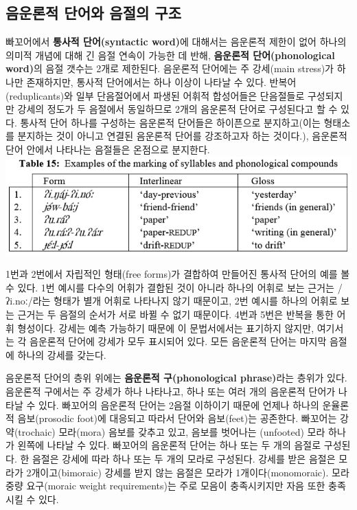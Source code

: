 \subsection{음운론적 단어와 음절의 구조}
빠꼬어에서 \textbf{통사적 단어(syntactic word)}에 대해서는 음운론적 제한이 없어 하나의 의미적 개념에 대해 긴 음절 연속이 가능한 데 반해,  \textbf{음운론적 단어(phonological word)}의 음절 갯수는 2개로 제한된다. 
음운론적 단어에는 주 강세(main stress)가 하나만 존재하지만, 통사적 단어에서는 하나 이상이 나타날 수 있다. 반복어(reduplicants)와 일부 단음절어에서 파생된 어휘적 합성어들은 단음절들로 구성되지만 강세의 정도가 두 음절에서 동일하므로 2개의 음운론적 단어로 구성된다고 할 수 있다. 통사적 단어 하나를 구성하는 음운론적 단어들은 하이픈으로 분지하고(이는 형태소를 분지하는 것이 아니고 연결된 음운론적 단어를 강조하고자 하는 것이다.), 음운론적 단어 안에서 나타나는 음절들은 온점으로 분지한다. \\

\includegraphics{Pacoh/src/PacohTable15.png}

1번과 2번에서 자립적인 형태(free forms)가 결합하여 만들어진 통사적 단어의 예를 볼 수 있다.
1번 예시를 다수의 어휘가 결합된 것이 아니라 하나의 어휘로 보는 근거는 /ʔi.noː/라는 형태가 별개 어휘로 나타나지 않기 때문이고, 2번 예시를 하나의 어휘로 보는 근거는 두 음절의 순서가 서로 바뀔 수 없기 때문이다.
4번과 5번은 반복을 통한 어휘 형성이다. 강세는 예측 가능하기 때문에 이 문법서에서는 표기하지 않지만, 여기서는 각 음운론적 단어에 강세가 모두 표시되어 있다. 모든 음운론적 단어는 마지막 음절에 하나의 강세를 갖는다.

음운론적 단어의 층위 위에는 \textbf{음운론적 구(phonological phrase)}라는 층위가 있다. 음운론적 구에서는 주 강세가 하나 나타나고, 하나 또는 여러 개의 음운론적 단어가 나타날 수 있다. 빠꼬어의 음운론적 단어는 2음절 이하이기 때문에 언제나 하나의 운율론적 음보(prosodic foot)에 대응되고 따라서 단어와 음보(feet)는 공존한다. 빠꼬어는 강약(trochaic) 모라(mora) 음보를 갖추고 있고, 음보를 벗어나는 (unfooted) 모라 하나가 왼쪽에 나타날 수 있다.
빠꼬어의 음운론적 단어는 하나 또는 두 개의 음절로 구성된다. 한 음절은 강세에 따라 하나 또는 두 개의 모라로 구성된다. 강세를 받은 음절은 모라가 2개이고(bimoraic) 강세를 받지 않는 음절은 모라가 1개이다(monomoraic). 모라 중량 요구(moraic weight requirements)는 주로 모음이 충족시키지만 자음 또한 충족시킬 수 있다.

